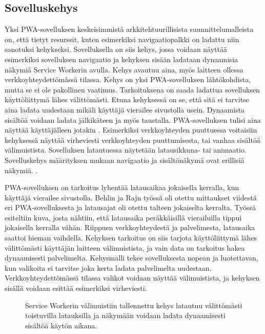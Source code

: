 \documentclass{tktltiki}
\begin{document}
\subsection{Sovelluskehys}

Yksi PWA-sovelluksen keskeisimmistä arkkitehtuurillisista suunnittelumalleista on, että tietyt resurssit, kuten esimerkiksi navigaatiopalkki on ladattu niin sanotuksi kehykseksi. \cite{8441701} Sovelluksella on siis kehys, jossa voidaan näyttää esimerkiksi sovelluksen navigaatio ja kehyksen sisään ladataan dynaamisia näkymiä Service Workerin avulla. Kehys avautuu aina, myös laitteen ollessa verkkoyhteydettömässä tilassa. Kehys on yksi PWA-sovelluksen lähtökohdista, mutta se ei ole pakollinen vaatimus. Tarkoituksena on saada ladattua sovelluksen käyttöliittymä lähes välittömästi. Etuna kehyksessä on se, että sitä ei tarvitse aina ladata uudestaan mikäli käyttäjä vierailee sivustolla usein. Dynaamista sisältöä voidaan ladata jälkikäteen ja myös taustalla. PWA-sovelluksen tulisi aina näyttää käyttäjälleen jotakin \cite{von2018progressive}. Esimerkiksi verkkoyhteyden puuttuessa voitaisiin kehyksessä näyttää virheviesti verkkoyhteyden puuttumisesta, tai vanhaa sisältöä välimuistista. Sovelluksen latautuessa näytetään latausikkuna- tai animaatio. Sovelluskehys määrityksen mukaan navigaatio ja sisältönäkymä ovat erillisiä näkymiä. \cite{Google4}.

PWA-sovelluksen on tarkoitus lyhentää latausaikaa jokaisella kerralla, kun käyttäjä vierailee sivustolla. Behlin ja Rajn työssä \cite{8441701} oli otettu mittaukset viidestä eri PWA-sovelluksesta ja latausajat oli otettu talteen jokaiselta kerralta. Työssä esiteltiin kuva, josta nähtiin, että latausaika peräkkäisillä vierailuilla tippui jokaisella kerralla vähän. Riippuen verkkoyhteydestä ja palvelimesta, latausaika saattoi hieman vaihdella. Kehyksen tarkoitus on siis tarjota käyttöliittymä lähes välittömästi käyttäjän laitteen välimuistista, ja vain data on tarkoitus hakea dynaamisesti palvelimelta. Kehysmalli tekee sovelluksesta nopean ja luotettavan, kun valikoita ei tarvitse joka kerta ladata palvelimelta uudestaan. Verkkoyhteydettömässä tilassa valikot voidaan näyttää välimuistista, ja kehyksen sisällä voidaan esittää esimerkiksi virheviesti.

\begin{figure}[!htbp]
\begin{center}
\caption{Service Workerin välimuistiin tallennettu kehys latautuu välittömästi toistuvilla latauksilla ja näkymään voidaan ladata dynaamisesti sisältöä käytön aikana. }
\label{App shell}
\end{center}
\end{figure}
\end{document}
